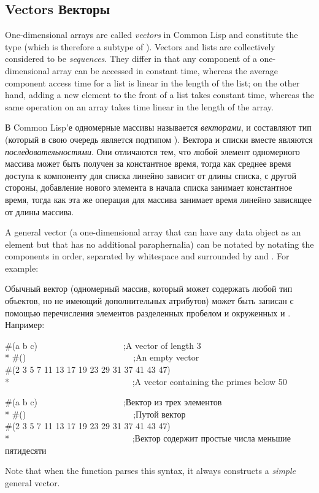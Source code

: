 \subsection{Vectors Векторы}

One-dimensional arrays are called \emph{vectors} in Common Lisp
and constitute the type  (which is therefore a subtype of ).
Vectors and lists are collectively considered to be
\emph{sequences}.  They differ in that any component of a one-dimensional array
can be accessed in constant time,
whereas the average component access time for a
list is linear in the length of the list; on the other hand, adding a new
element to the front of a list takes constant time, whereas the same
operation on an array takes time linear in the length of the array.

В Common Lisp'е одномерные массивы называется \emph{векторами}, и составляют тип
 (который в свою очередь является подтипом ).
Вектора и списки вместе являются \emph{последовательностями}. Они отличаются тем,
что любой элемент одномерного массива может быть получен за константное время,
тогда как среднее время доступа к компоненту для списка линейно зависит от длины
списка, с другой стороны, добавление нового элемента в начала списка занимает
константное время, тогда как эта же операция для массива занимает время линейно
зависящее от длины массива.

A general vector (a one-dimensional array
that can have any data object as an element but that has
no additional paraphernalia) can be notated by notating the
components in order, separated by whitespace and surrounded by \cd{\#(}
and \cd{)}.
For example:

Обычный вектор (одномерный массив, который может содержать любой тип объектов,
но не имеющий дополнительных атрибутов) может быть записан с помощью
перечисления элементов разделенных пробелом и окруженных \cd{\#(} и
\cd{)}.
Например:
\begin{lisp}
\#(a b c)~~~~~~~~~~~~~~~~~~~~;\textrm{A vector of length 3} \\*
\#()~~~~~~~~~~~~~~~~~~~~~~~~~;\textrm{An empty vector} \\
\#(2 3 5 7 11 13 17 19 23 29 31 37 41 43 47) \\*
~~~~~~~~~~~~~~~~~~~~~~~~~~~~;\textrm{A vector containing the primes below 50}
\end{lisp}

\begin{lisp}
\#(a b c)~~~~~~~~~~~~~~~~~~~~;\textrm{Вектор из трех элементов} \\*
\#()~~~~~~~~~~~~~~~~~~~~~~~~~;\textrm{Путой вектор} \\
\#(2 3 5 7 11 13 17 19 23 29 31 37 41 43 47) \\*
~~~~~~~~~~~~~~~~~~~~~~~~~~~~;\textrm{Вектор содержит простые числа меньшие пятидесяти}
\end{lisp}
Note that when the function  parses this syntax, it always constructs
a \emph{simple} general vector.

